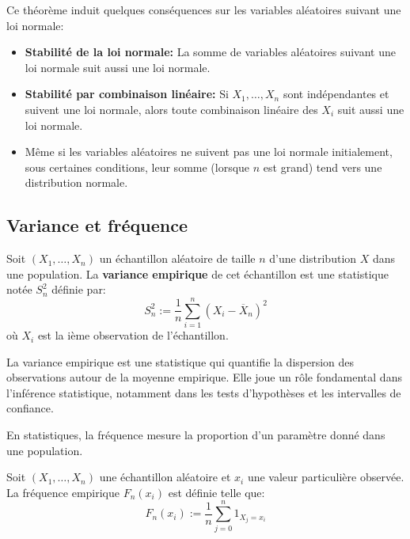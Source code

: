\begin{prop}[Conséquences]
    Ce théorème induit quelques conséquences sur les variables aléatoires suivant une loi normale: 
    \begin{itemize}
        \item \textbf{Stabilité de la loi normale:} La somme de variables aléatoires suivant une loi 
            normale suit aussi une loi normale. 
        \item \textbf{Stabilité par combinaison linéaire: }Si $X_1, \dots, X_n$ sont indépendantes et suivent une loi normale, alors toute 
             combinaison linéaire des $X_i$ suit aussi une loi normale. 
        \item Même si les variables aléatoires ne suivent pas une loi normale initialement, 
            sous certaines conditions, leur somme (lorsque $n$ est grand) tend vers une distribution normale.
    \end{itemize}
\end{prop}

\subsection{Variance et fréquence}

\begin{definition}
    Soit $(X_1, \dots, X_n)$ un échantillon aléatoire de taille $n$ d'une distribution $X$ dans une population. 
    La \textbf{variance empirique} de cet échantillon est une statistique notée $S_n^2$ définie par: 
        \[ \boxed{
            S_n^2 := \frac{1}{n} \sum_{i=1}^{n} (X_i - \overline{X}_n)^2 
        } \] 
    où $X_i$ est la ième observation de l'échantillon. 
\end{definition}

\begin{remark}[Interprétation]
    La variance empirique est une statistique qui quantifie la dispersion des observations
     autour de la moyenne empirique. Elle joue un rôle fondamental dans l'inférence statistique, 
     notamment dans les tests d'hypothèses et les intervalles de confiance.
\end{remark}

En statistiques, la fréquence mesure la proportion d'un paramètre donné dans une population. 

\begin{definition}
    Soit $(X_1, \dots, X_n)$ une échantillon aléatoire et $x_i$ une valeur particulière observée. 
    La fréquence empirique $F_n(x_i)$ est définie telle que: 
        \[ F_n(x_i) := \frac{1}{n} \sum_{j=0}^{n} 1_{X_j = x_i} \] 
\end{definition}

